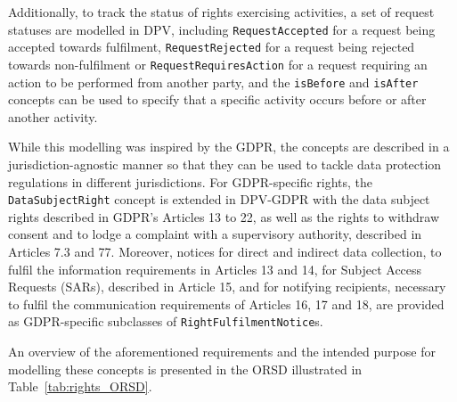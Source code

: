 Additionally, to track the status of rights exercising activities, a set of request statuses are modelled in DPV, including \texttt{RequestAccepted} for a request being accepted towards fulfilment, \texttt{RequestRejected} for a request being rejected towards non-fulfilment or \texttt{RequestRequiresAction} for a request requiring an action to be performed from another party, and the \texttt{isBefore} and \texttt{isAfter} concepts can be used to specify that a specific activity occurs before or after another activity.

While this modelling was inspired by the GDPR, the concepts are described in a jurisdiction-agnostic manner so that they can be used to tackle data protection regulations in different jurisdictions.
For GDPR-specific rights, the \texttt{DataSubjectRight} concept is extended in DPV-GDPR with the data subject rights described in GDPR's Articles 13 to 22, as well as the rights to withdraw consent and to lodge a complaint with a supervisory authority, described in Articles 7.3 and 77.
Moreover, notices for direct and indirect data collection, to fulfil the information requirements in Articles 13 and 14, for Subject Access Requests (SARs), described in Article 15, and for notifying recipients, necessary to fulfil the communication requirements of Articles 16, 17 and 18, are provided as GDPR-specific subclasses of \texttt{RightFulfilmentNotice}s.

An overview of the aforementioned requirements and the intended purpose for modelling these concepts is presented in the ORSD illustrated in Table~\ref{tab:rights_ORSD}.


